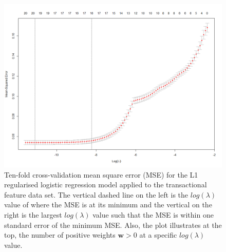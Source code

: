 \begin{figure}[]
	\begin{center}
		\includegraphics[scale=0.45]{fig/CH3/cv_lambda_trans.png}
		\caption{Ten-fold cross-validation mean square error (MSE) for the L1 regularised logistic regression model applied to the transactional feature data set. The vertical dashed line on the left is the $log(\lambda)$ value of where the MSE is at its minimum and the vertical on the right is the largest $log(\lambda)$ value such that the MSE is within one standard error of the minimum MSE. Also, the plot illustrates at the top, the number of positive weights $\boldsymbol{w} > 0$ at a specific $log(\lambda)$ value.}
		\label{fig:ch3_lr_lambda_cv_trans}
	\end{center}	
\end{figure}

